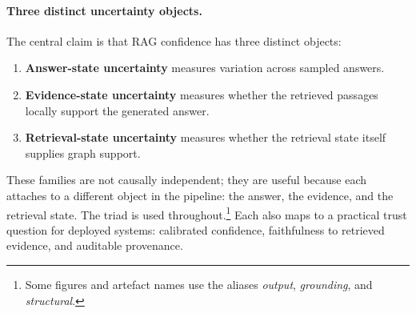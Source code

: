 \paragraph{Three distinct uncertainty objects.}
The central claim is that RAG confidence has three distinct objects:
\begin{enumerate}
  \item \textbf{Answer-state uncertainty} measures variation across sampled
  answers.
  \item \textbf{Evidence-state uncertainty} measures whether the retrieved
  passages locally support the generated answer.
  \item \textbf{Retrieval-state uncertainty} measures whether the retrieval
  state itself supplies graph support.
\end{enumerate}
These families are not causally independent; they are useful because each
attaches to a different object in the pipeline: the answer, the evidence, and
the retrieval state.
The triad is used throughout.\footnote{Some figures and artefact names use the
aliases \emph{output}, \emph{grounding}, and \emph{structural}.}
Each also maps to a practical trust question for deployed systems: calibrated
confidence, faithfulness to retrieved evidence, and auditable provenance.

